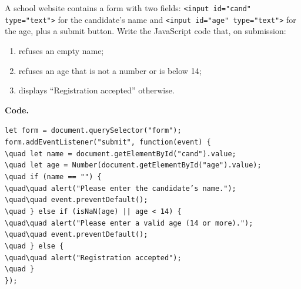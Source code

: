 \documentclass[11pt]{article}
\begin{document}
\begin{exoresolu}
A school website contains a form with two fields: \texttt{<input id="cand" type="text">} for the candidate's name and \texttt{<input id="age" type="text">} for the age, plus a submit button. Write the JavaScript code that, on submission:
\begin{enumerate}
\item refuses an empty name;
\item refuses an age that is not a number or is below 14;
\item displays ``Registration accepted'' otherwise.
\end{enumerate}
\tcblower
\textbf{Code.}
\begin{center}
\texttt{let form = document.querySelector("form");}\\
\texttt{form.addEventListener("submit", function(event) \{}\\
\texttt{\textbackslash{}quad let name = document.getElementById("cand").value;}\\
\texttt{\textbackslash{}quad let age = Number(document.getElementById("age").value);}\\
\texttt{\textbackslash{}quad if (name == "") \{}\\
\texttt{\textbackslash{}quad\textbackslash{}quad alert("Please enter the candidate's name.");}\\
\texttt{\textbackslash{}quad\textbackslash{}quad event.preventDefault();}\\
\texttt{\textbackslash{}quad \} else if (isNaN(age) || age < 14) \{}\\
\texttt{\textbackslash{}quad\textbackslash{}quad alert("Please enter a valid age (14 or more).");}\\
\texttt{\textbackslash{}quad\textbackslash{}quad event.preventDefault();}\\
\texttt{\textbackslash{}quad \} else \{}\\
\texttt{\textbackslash{}quad\textbackslash{}quad alert("Registration accepted");}\\
\texttt{\textbackslash{}quad \}}\\
\texttt{\});}
\end{center}


\end{exoresolu}
\end{document}

